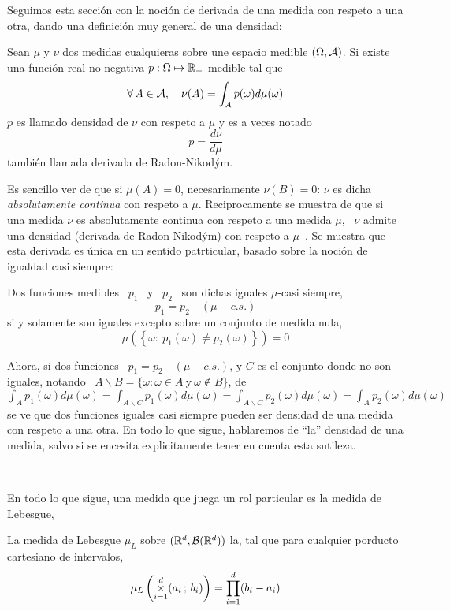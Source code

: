 Seguimos esta secci\'on con la noci\'on  de derivada de una medida con respeto a
una otra, dando una definici\'on muy general de una densidad:
%
\begin{definicion}\label{def:MP:DensidadMedida}
  Sean  $\mu$  y  $\nu$  dos  medidas  cualquieras  sobre  une  espacio  medible
  $(\Omega,\mathcal{A})$.  Si  existe una funci\'on  real no negativa $p:  \Omega \mapsto
  \mathbb{R}_+$ medible tal que
  \[
  \forall \, A \in \mathcal{A}, \quad \nu(A) = \int_A p(\omega) d\mu(\omega)
  \]
  $p$ es llamado densidad de $\nu$ con respeto a $\mu$ y es a veces notado
  \[
  p = \frac{d\nu}{d\mu}
  \]
  tambi\'en llamada derivada de Radon-Nikod\'ym.
\end{definicion}
%
Es sencillo ver  de que si $\mu(A)  = 0$, necesariamente $\nu(B) =  0$: $\nu$ es
dicha  {\it  absolutamente continua}  con  respeto  a  $\mu$. Reciprocamente  se
muestra de que  si una medida $\nu$ es absolutamente continua  con respeto a una
medida  $\mu$, \  $\nu$ admite  una densidad  (derivada de  Radon-Nikod\'ym) con
respeto a  $\mu$~\cite{Nyk30, AthLah06, Bog07:v1,  Coh13}.  Se muestra  que esta
derivada  es \'unica  en un  sentido patrticular,  basado sobre  la  noci\'on de
igualdad casi siempre:

\begin{definicion}
  Dos funciones  medibles \ $p_1$  \ y \  $p_2$ \ son dichas  iguales $\mu$-casi
  siempre,
  \[
  p_1 = p_2 \quad (\mu-c.s.)
  \]
  si y solamente son iguales excepto sobre un conjunto de medida nula,
  \[
  \mu\left( \left\{ \omega: \: p_1(\omega) \ne p_2(\omega) \right\} \right) = 0
  \]
\end{definicion}
%
\noindent Ahora, si  dos funciones \ $p_1  = p_2 \quad (\mu-c.s.)$, y  $C$ es el
conjunto donde no son iguales, notando \ $A \backslash B = \{ \omega: \omega \in
A \:  \mbox{y} \:  \omega \not\in B\}$,  de \ $\displaystyle  \int_A p_1(\omega)
d\mu(\omega) = \int_{A\backslash C} p_1(\omega) d\mu(\omega) = \int_{A\backslash
  C} p_2(\omega) d\mu(\omega)  = \int_A p_2(\omega) d\mu(\omega)$ se  ve que dos
funciones iguales casi  siempre pueden ser densidad de una  medida con respeto a
una otra.   En todo lo que sigue,  hablaremos de ``la'' densidad  de una medida,
salvo si se encesita explicitamente tener en cuenta esta sutileza.

\

En todo lo que sigue, una medida que juega un rol particular es la medida de Lebesgue,
%
\begin{definicion}
  La medida de  Lebesgue $\mu_L$ sobre $(\mathbb{R}^d,\mathcal{B}(\mathbb{R}^d))$ la,  tal que para
  cualquier porducto cartesiano de intervalos,
  \[
  \mu_L\left(  \operatorname*{\times}_{i=1}^d  (a_i  \,  ;  \, b_i)  \right)  =  \prod_{i=1}^d
  (b_i-a_i)
  \]
\end{definicion}

